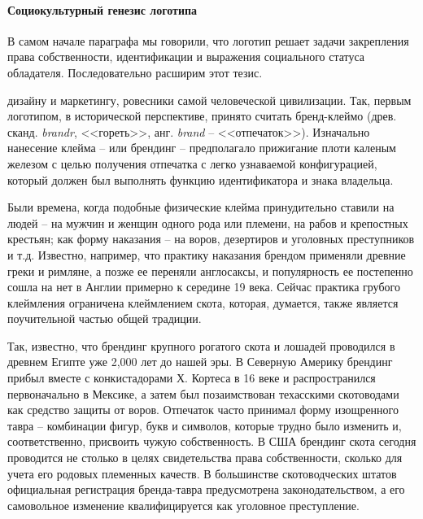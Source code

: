 \paragraph{Социокультурный генезис логотипа}

В самом начале параграфа мы говорили, что логотип решает задачи закрепления права
собственности, идентификации и выражения социального статуса обладателя.
Последовательно расширим этот тезис.

дизайну и маркетингу, ровесники самой человеческой цивилизации. Так, первым логотипом,
в исторической перспективе, принято считать бренд-клеймо (древ. сканд. \emph{brandr},
<<гореть>>, анг. \emph{brand} -- <<отпечаток>>)\autocites{markritson}{colapinto2011}{tradetimeline}{zapenko2007}.
Изначально нанесение клейма -- или брендинг -- предполагало прижигание плоти
каленым железом с целью получения отпечатка с легко узнаваемой конфигурацией,
который должен был выполнять функцию идентификатора и знака владельца.

Были времена, когда подобные физические клейма принудительно ставили на людей --
на мужчин и женщин одного рода или племени, на рабов и крепостных крестьян;
как форму наказания -- на воров, дезертиров и уголовных преступников и т.д.
Известно, например, что практику наказания брендом применяли древние греки и
римляне, а позже ее переняли англосаксы, и популярность ее постепенно сошла на
нет в Англии примерно к середине 19 века. Сейчас практика грубого клеймления ограничена
клеймлением скота, которая, думается, также является поучительной  частью общей традиции.

Так, известно, что брендинг крупного рогатого скота и лошадей проводился в древнем
Египте уже 2,000 лет до нашей эры. В Северную Америку брендинг прибыл вместе с
конкистадорами Х. Кортеса в 16 веке и распространился первоначально в Мексике,
а затем был позаимствован техасскими скотоводами как средство защиты от воров.
Отпечаток часто принимал форму изощренного тавра -- комбинации фигур, букв и символов,
которые трудно было изменить и, соответственно, присвоить чужую собственность.
В США брендинг скота сегодня проводится не столько в целях свидетельства права
собственности, сколько для учета его родовых племенных качеств. В большинстве
скотоводческих штатов официальная регистрация бренда-тавра предусмотрена
законодательством, а его самовольное изменение квалифицируется как уголовное
преступление\autocite{1994encarta}.

